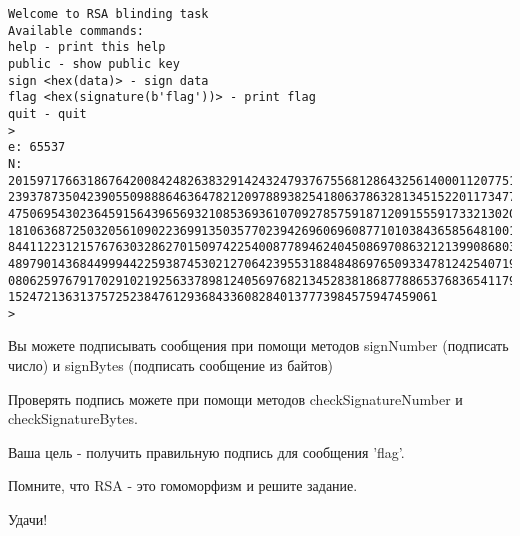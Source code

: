 \documentclass[11pt]{article}
\makeatletter
\newcommand{\boxspacing}{\kern\kvtcb@left@rule\kern\kvtcb@boxsep}
\newcommand{\prompt}[4]{
        \ttfamily\llap{{\color{#2}[#3]:\hspace{3pt}#4}}\vspace{-\baselineskip}
    }
\makeatother
\begin{document}
    \begin{Verbatim}[commandchars=\\\{\}]
Welcome to RSA blinding task
Available commands:
help - print this help
public - show public key
sign <hex(data)> - sign data
flag <hex(signature(b'flag'))> - print flag
quit - quit
>
e: 65537
N: 20159717663186764200842482638329142432479376755681286432561400011207751568770
23937873504239055098886463647821209788938254180637863281345152201173477839435246
47506954302364591564396569321085369361070927857591871209155591733213020275252290
18106368725032056109022369913503577023942696069608771010384365856481001383579432
84411223121576763032862701509742254008778946240450869708632121399086803127321961
48979014368449994422593874530212706423955318848486976509334781242540719122324457
08062597679170291021925633789812405697682134528381868778865376836541179591638312
152472136313757252384761293684336082840137773984575947459061
>
    \end{Verbatim}

    Вы можете подписывать сообщения при помощи методов signNumber (подписать
число) и signBytes (подписать сообщение из байтов)

Проверять подпись можете при помощи методов checkSignatureNumber и
checkSignatureBytes.

Ваша цель - получить правильную подпись для сообщения 'flag'.

Помните, что RSA - это гомоморфизм и решите задание.

Удачи!

    \begin{tcolorbox}[breakable, size=fbox, boxrule=1pt, pad at break*=1mm,colback=cellbackground, colframe=cellborder]
\prompt{In}{incolor}{ }{\boxspacing}
\begin{Verbatim}[commandchars=\\\{\}]

\end{Verbatim}
\end{tcolorbox}


    
    
    
\end{document}

